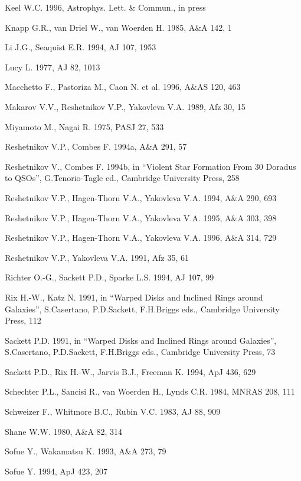 \begin{thebibliography}{}
\bibitem{} Keel W.C. 1996, Astrophys. Lett. \& Commun., in press

\bibitem{} Knapp G.R., van Driel W., van Woerden H. 1985, A\&A 142, 1

\bibitem{} Li J.G., Seaquist E.R. 1994, AJ 107, 1953

\bibitem{} Lucy L. 1977, AJ 82, 1013

\bibitem{} Macchetto F., Pastoriza M., Caon N. et al. 1996, A\&AS 120, 463

\bibitem{} Makarov V.V., Reshetnikov V.P., Yakovleva V.A. 1989, Afz 30, 15

\bibitem{} Miyamoto M., Nagai R. 1975, PASJ 27, 533

\bibitem{} Reshetnikov V.P., Combes F. 1994a, A\&A 291, 57

\bibitem{} Reshetnikov V., Combes F. 1994b, in ``Violent Star Formation From
30 Doradus to QSOs'', G.Tenorio-Tagle ed., Cambridge University Press, 258

\bibitem{} Reshetnikov V.P., Hagen-Thorn V.A., Yakovleva V.A. 1994,
A\&A 290, 693

\bibitem{} Reshetnikov V.P., Hagen-Thorn V.A., Yakovleva V.A. 1995,
A\&A 303, 398

\bibitem{} Reshetnikov V.P., Hagen-Thorn V.A., Yakovleva V.A. 1996,
A\&A 314, 729

\bibitem{} Reshetnikov V.P., Yakovleva V.A. 1991, Afz 35, 61

\bibitem{} Richter O.-G., Sackett P.D., Sparke L.S. 1994, AJ 107, 99

\bibitem{} Rix H.-W., Katz N. 1991, in ``Warped Disks and Inclined
Rings around Galaxies'', S.Casertano, P.D.Sackett, F.H.Briggs eds., 
Cambridge University Press, 112

\bibitem{} Sackett P.D. 1991, in ``Warped Disks and Inclined Rings around
Galaxies'', S.Casertano, P.D.Sackett, F.H.Briggs eds., Cambridge University
Press, 73

\bibitem{} Sackett P.D., Rix H.-W., Jarvis B.J., Freeman K. 1994, ApJ 436, 629

\bibitem{} Schechter P.L., Sancisi R., van Woerden H., Lynds C.R. 1984,
MNRAS 208, 111

\bibitem{} Schweizer F., Whitmore B.C., Rubin V.C. 1983, AJ 88, 909

\bibitem{} Shane W.W. 1980, A\&A 82, 314

\bibitem{} Sofue Y., Wakamatsu K. 1993, A\&A 273, 79

\bibitem{} Sofue Y. 1994, ApJ 423, 207


\end{thebibliography}
